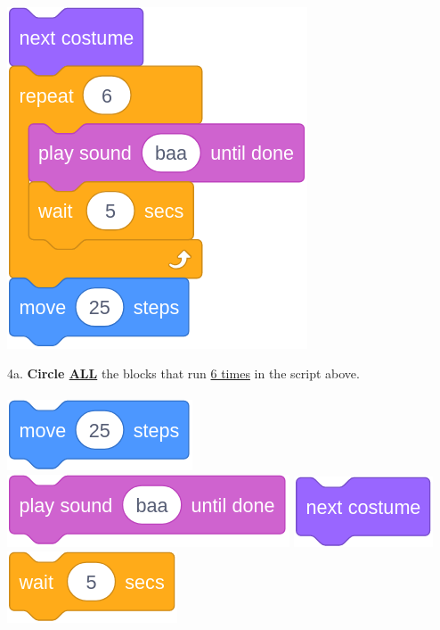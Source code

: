 \documentclass[letterpaper,12pt]{article}
\begin{document}
\noindent \dotfill \\

\begin{center}
\includegraphics[scale=.3]{q4_script0.png}
\end{center}

\noindent 4a. \textbf{Circle \underline{ALL}} the blocks that run \underline{6 times} in the script above. \\ \\
\includegraphics[scale=.3]{q4_script1.png} \hspace{1cm}
\includegraphics[scale=.3]{q4_script2.png} \hspace{1cm}
\includegraphics[scale=.3]{q4_script3.png} \hspace{1cm}
\includegraphics[scale=.3]{q4_script4.png} \hspace{1cm}\\
\end{document}
